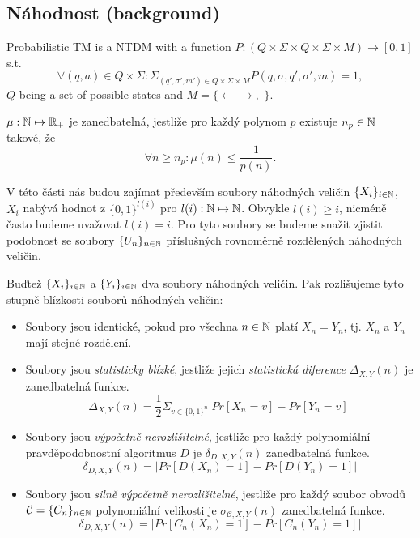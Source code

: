 \subsection*{Náhodnost (background)}

\begin{defn}[Probabilistic TM]
	Probabilistic TM is a NTDM with a function $P:(Q\times \Sigma \times Q \times \Sigma \times M)\rightarrow [0,1]$ s.t.
	\[
		\forall (q,a) \in Q\times \Sigma: \Sigma_{(q',\sigma',m') \in Q\times \Sigma \times M}P(q,\sigma,q',\sigma',m)=1,
	\]
	$Q$ being a set of possible states and $M=\{\leftarrow\,\rightarrow,\_\}$.
\end{defn}

\begin{defn}
	$\mu:\mathbb{N}\mapsto\mathbb{R}_+$ je zanedbatelná, jestliže pro každý polynom $p$ existuje $n_p \in \mathbb{N}$ takové, že
	\[
		\forall n \geq n_p: \mu(n)\leq\frac{1}{p(n)}.
	\]
\end{defn}

V této části nás budou zajímat především soubory náhodných veličin $\{X_i\}_{i\in\mathbb{N}}$, $X_i$ nabývá hodnot z $\{0,1\}^{l(i)}$ pro $l(i):\mathbb{N}\mapsto \mathbb{N}$. Obvykle $l(i)\geq i$, nicméně často budeme uvažovat $l(i)=i$. Pro tyto soubory se budeme snažit zjistit podobnost se soubory $\{U_n\}_{n\in\mathbb{N}}$ příslušných rovnoměrně rozdělených náhodných veličin.

\begin{defn}
	Buďtež $\{X_i\}_{i\in\mathbb{N}}$ a $\{Y_i\}_{i\in\mathbb{N}}$ dva soubory náhodných veličin. Pak rozlišujeme tyto stupně blízkosti souborů náhodných veličin:
	\begin{itemize}
		\item Soubory jsou identické, pokud pro všechna $n\in\mathbb{N}$ platí $X_n=Y_n$, tj. $X_n$ a $Y_n$ mají stejné rozdělení.
		\item Soubory jsou \textit{statisticky blízké}, jestliže jejich \textit{statistická diference} $\Delta_{X,Y}(n)$ je zanedbatelná funkce.
		\[
			\Delta_{X,Y}(n) = \frac{1}{2}\Sigma_{v\in\{0,1\}^n}|Pr[X_n=v]-Pr[Y_n=v]|
		\]
		\item Soubory jsou \textit{výpočetně nerozlišitelné}, jestliže pro každý polynomiální pravděpodobnostní algoritmus $D$ je $\delta_{D,X,Y}(n)$ zanedbatelná funkce.
		\[
			\delta_{D,X,Y}(n) = |Pr[D(X_n)=1]-Pr[D(Y_n)=1]|
		\]
		\item Soubory jsou \textit{silně výpočetně nerozlišitelné}, jestliže pro každý soubor obvodů $\mathcal{C}=\{C_n\}_{n\in\mathbb{N}}$ polynomiální velikosti je $\sigma_{\mathcal{C},X,Y}(n)$ zanedbatelná funkce.
		\[
			\delta_{D,X,Y}(n) = |Pr[C_n(X_n)=1]-Pr[C_n(Y_n)=1]|
		\]
	\end{itemize}
\end{defn}

